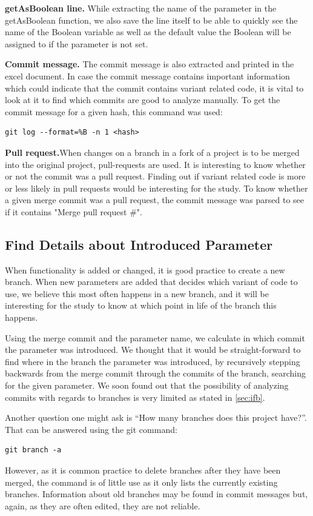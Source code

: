 \textbf{getAsBoolean line.} While extracting the name of the parameter in the getAsBoolean function, we also save the line itself to be able to quickly see the name of the Boolean variable as well as the default value the Boolean will be assigned to if the parameter is not set.

\textbf{Commit message.} The commit message is also extracted and printed in the excel document. In case the commit message contains important information which could indicate that the commit contains variant related code, it is vital to look at it to find which commits are good to analyze manually.
To get the commit message for a given hash, this command was used:
\lstset{language=Bash,numbers=left,xleftmargin=2em,frame=single,framexleftmargin=1.5em}
\begin{lstlisting}[frame=single,breaklines=true,tabsize=2]
git log --format=%B -n 1 <hash>
\end{lstlisting}

\textbf{Pull request.}When changes on a branch in a fork of a project is to be merged into the original project, pull-requests are used. It is interesting to know whether or not the commit was a pull request. Finding out if variant related code is more or less likely in pull requests would be interesting for the study. To know whether a given merge commit was a pull request, the commit message was parsed to see if it contains "Merge pull request \#".
\subsection{Find Details about Introduced Parameter}
When functionality is added or changed, it is good practice to create a new branch. When new parameters are added that decides which variant of code to use, we believe this most often happens in a new branch, and it will be interesting for the study to know at which point in life of the branch this happens.

Using the merge commit and the parameter name, we calculate in which commit the parameter was introduced. We thought that it would be straight-forward to find where in the branch the parameter was introduced, by recursively stepping backwards from the merge commit through the commits of the branch, searching for the given parameter. We soon found out that the possibility of analyzing commits with regards to branches is very limited as stated in \ref{sec:ifb}.

Another question one might ask is “How many branches does this project have?”. That can be answered using the git command:
\lstset{language=Bash,numbers=left,xleftmargin=2em,frame=single,framexleftmargin=1.5em}
\begin{lstlisting}[frame=single,breaklines=true,tabsize=2]
git branch -a
\end{lstlisting}
However, as it is common practice to delete branches after they have been merged, the command is of little use as it only lists the currently existing branches. Information about old branches may be found in commit messages but, again, as they are often edited, they are not reliable.

